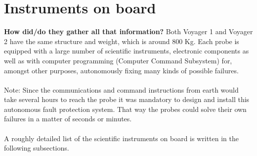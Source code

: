 \documentclass[11pt,a4paper]{article}
\begin{document}
\section{Instruments on board}
\textbf{How did/do they gather all that information?}
Both Voyager 1 and Voyager 2 have the same structure and weight, which is around 800 Kg. Each probe is equipped with a large number of scientific instruments, electronic components as well as with computer programming (Computer Command Subsystem) for, amongst other purposes, autonomously fixing many kinds of possible failures.
\\\\
Note: Since the communications and command instructions from earth would take several hours to reach the probe it was mandatory to design and install this autonomous fault protection system. That way the probes could solve their own failures in a matter of seconds or minutes. 
\\\\
A roughly detailed list of the scientific instruments on board is written in the following subsections.
\end{document}
